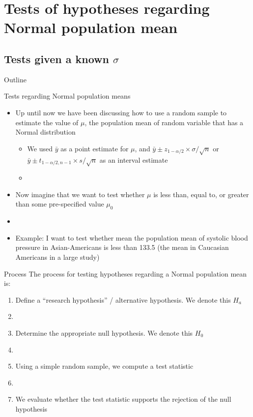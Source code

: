 \documentclass[xcolor=dvipsnames]{beamer}
\begin{document}
\section{Tests of hypotheses regarding Normal population mean}

\subsection{Tests given a known $\sigma$}
\begin{frame}{Outline}
	\tableofcontents[currentsection,subsectionstyle=show/shaded/hide]
\end{frame}

\begin{frame}{Tests regarding Normal population means}
	\begin{itemize}
		\item Up until now we have been discussing how to use a random sample to estimate the value of $\mu$, the population mean of random variable that has a Normal distribution
		\begin{itemize}
			\item We used $\bar{y}$ as a point estimate for $\mu$, and $\bar{y} \pm z_{1-\alpha / 2} \times \sigma / \sqrt{n}$ or $\bar{y} \pm t_{1-\alpha / 2, n - 1} \times s / \sqrt{n}$ as an interval estimate
			\item[]
		\end{itemize}
	\item Now imagine that we want to test whether $\mu$ is less than, equal to, or greater than some pre-specified value $\mu_0$
	\item[]
	\item Example: I want to test whether mean the population mean of systolic blood pressure in Asian-Americans is less than 133.5 (the mean in Caucasian Americans in a large study)
	
	\end{itemize}
\end{frame}

\begin{frame}{Process}
	The process for testing hypotheses regarding a Normal population mean is: 
	\begin{enumerate}
		\item Define a ``research hypothesis'' / alternative hypothesis. We denote this $H_a$
		\item[]
		\item Determine the appropriate null hypothesis. We denote this $H_0$
		\item[]
		\item Using a simple random sample, we compute a test statistic
		\item[]
		\item We evaluate whether the test statistic supports the rejection of the null hypothesis
	\end{enumerate}
\end{frame}
\end{document}
